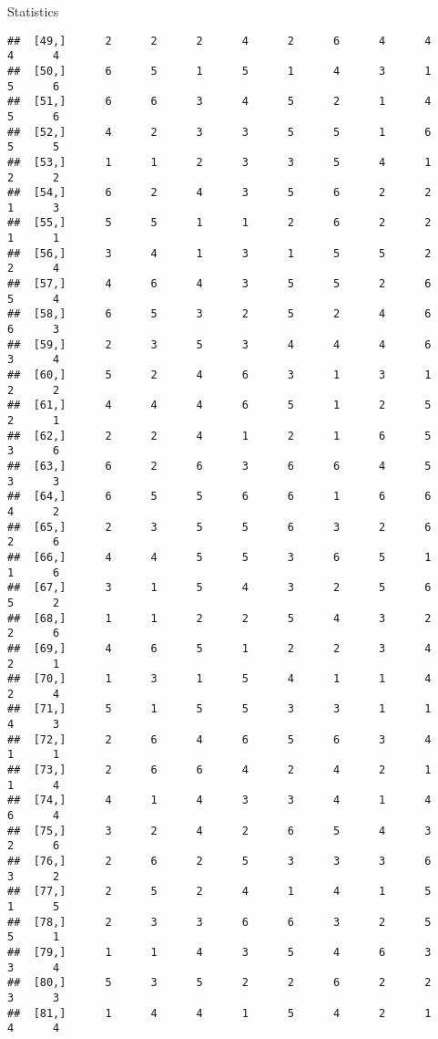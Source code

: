 \documentclass[
  ignorenonframetext,
]{beamer}
\begin{document}
\begin{frame}[fragile]{Statistics}
\begin{verbatim}
##  [49,]      2      2      2      4      2      6      4      4      4      4
##  [50,]      6      5      1      5      1      4      3      1      5      6
##  [51,]      6      6      3      4      5      2      1      4      5      6
##  [52,]      4      2      3      3      5      5      1      6      5      5
##  [53,]      1      1      2      3      3      5      4      1      2      2
##  [54,]      6      2      4      3      5      6      2      2      1      3
##  [55,]      5      5      1      1      2      6      2      2      1      1
##  [56,]      3      4      1      3      1      5      5      2      2      4
##  [57,]      4      6      4      3      5      5      2      6      5      4
##  [58,]      6      5      3      2      5      2      4      6      6      3
##  [59,]      2      3      5      3      4      4      4      6      3      4
##  [60,]      5      2      4      6      3      1      3      1      2      2
##  [61,]      4      4      4      6      5      1      2      5      2      1
##  [62,]      2      2      4      1      2      1      6      5      3      6
##  [63,]      6      2      6      3      6      6      4      5      3      3
##  [64,]      6      5      5      6      6      1      6      6      4      2
##  [65,]      2      3      5      5      6      3      2      6      2      6
##  [66,]      4      4      5      5      3      6      5      1      1      6
##  [67,]      3      1      5      4      3      2      5      6      5      2
##  [68,]      1      1      2      2      5      4      3      2      2      6
##  [69,]      4      6      5      1      2      2      3      4      2      1
##  [70,]      1      3      1      5      4      1      1      4      2      4
##  [71,]      5      1      5      5      3      3      1      1      4      3
##  [72,]      2      6      4      6      5      6      3      4      1      1
##  [73,]      2      6      6      4      2      4      2      1      1      4
##  [74,]      4      1      4      3      3      4      1      4      6      4
##  [75,]      3      2      4      2      6      5      4      3      2      6
##  [76,]      2      6      2      5      3      3      3      6      3      2
##  [77,]      2      5      2      4      1      4      1      5      1      5
##  [78,]      2      3      3      6      6      3      2      5      5      1
##  [79,]      1      1      4      3      5      4      6      3      3      4
##  [80,]      5      3      5      2      2      6      2      2      3      3
##  [81,]      1      4      4      1      5      4      2      1      4      4

\end{verbatim}
\end{frame}
\end{document}
